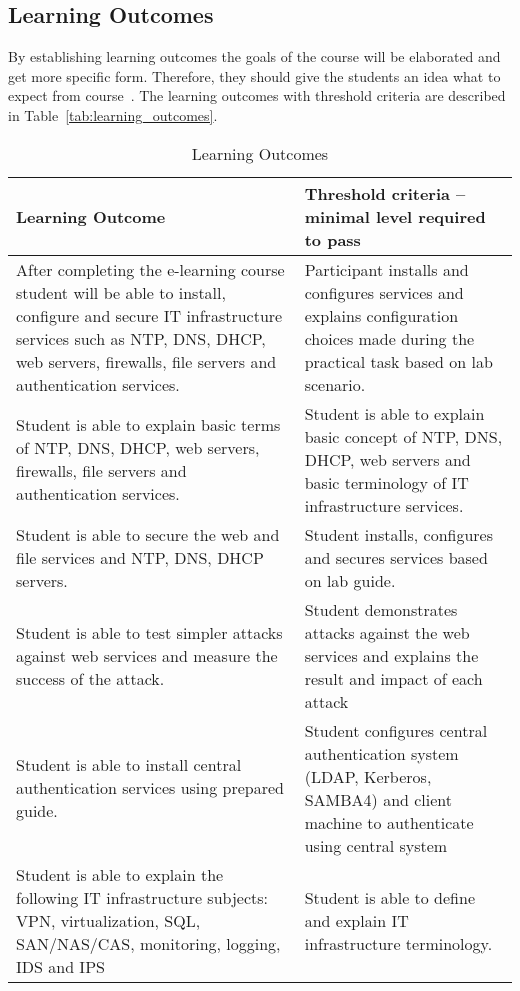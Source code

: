 \subsection{Learning Outcomes}

By establishing learning outcomes the goals of the course will be elaborated and get more specific form. Therefore, they should give the students an idea what to expect from course~\citep[p.~7]{OppeArenduskeskus2010}. The learning outcomes with threshold criteria are described in Table~\ref{tab:learning_outcomes}.
\begin{table}[h]
\centering
\caption{Learning Outcomes}
{ \small
\begin{tabular}{|p{7cm}|p{7cm}|}

\hline 
\color{blue} Learning Outcome &\color{blue}  Threshold criteria -- minimal level required to pass \\ 
\hline 

\hline 
After completing the e-learning course  student will be able to install, configure and secure  IT infrastructure services  such as \gls{NTP}, \gls{DNS}, \gls{DHCP}, web servers, firewalls, file servers and authentication services. & Participant installs and configures services and explains configuration choices made during the practical task based on lab scenario.\\ 
\hline 
Student is able to explain basic terms of \gls{NTP}, \gls{DNS}, \gls{DHCP}, web servers, firewalls, file servers and authentication services. 
& 

Student is able to explain basic concept of \gls{NTP}, \gls{DNS}, \gls{DHCP}, web servers and  basic terminology of IT infrastructure services.
\\ 
\hline 
Student is able to secure the web and file services and \gls{NTP}, \gls{DNS}, \gls{DHCP} servers.

& 
Student installs, configures and secures services based on lab guide.
\\ 
\hline 
Student is able to test simpler attacks against web services and measure the success of the attack.

& Student demonstrates attacks against the web services and explains the result and impact of each attack \\ 
\hline 
Student is able to install central authentication services using prepared guide.
& 
Student configures central authentication system (LDAP, Kerberos, SAMBA4) and client machine to authenticate using central system
\\
\hline 
Student is able to explain the following IT infrastructure subjects: VPN, virtualization, \gls{SQL}, SAN/NAS/CAS, monitoring, logging, \gls{IDS} and \gls{IPS}
& 
Student is able to define and explain IT infrastructure terminology.
\\ 


\end{tabular}}
\end{table}
